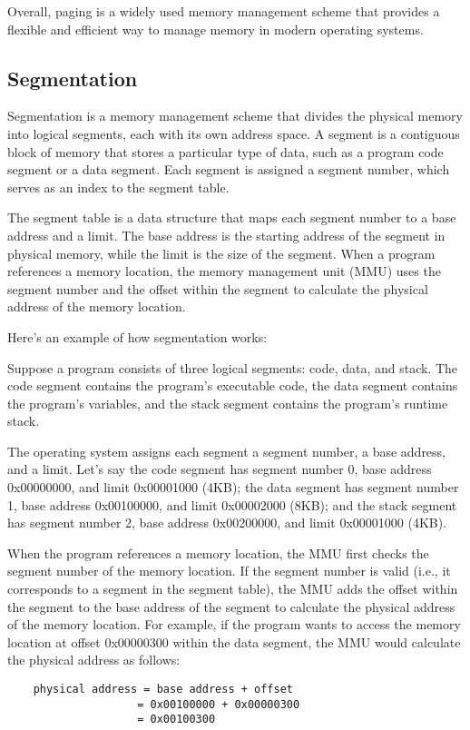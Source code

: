 \documentclass[journal,onecolumn]{IEEEtran}
\begin{document}
Overall, paging is a widely used memory management scheme that provides a flexible and efficient way to manage memory in modern operating systems.

\subsection{Segmentation}
Segmentation is a memory management scheme that divides the physical memory into logical segments, each with its own address space. A segment is a contiguous block of memory that stores a particular type of data, such as a program code segment or a data segment. Each segment is assigned a segment number, which serves as an index to the segment table.

The segment table is a data structure that maps each segment number to a base address and a limit. The base address is the starting address of the segment in physical memory, while the limit is the size of the segment. When a program references a memory location, the memory management unit (MMU) uses the segment number and the offset within the segment to calculate the physical address of the memory location.

Here's an example of how segmentation works:

Suppose a program consists of three logical segments: code, data, and stack. The code segment contains the program's executable code, the data segment contains the program's variables, and the stack segment contains the program's runtime stack.

The operating system assigns each segment a segment number, a base address, and a limit. Let's say the code segment has segment number 0, base address 0x00000000, and limit 0x00001000 (4KB); the data segment has segment number 1, base address 0x00100000, and limit 0x00002000 (8KB); and the stack segment has segment number 2, base address 0x00200000, and limit 0x00001000 (4KB).

When the program references a memory location, the MMU first checks the segment number of the memory location. If the segment number is valid (i.e., it corresponds to a segment in the segment table), the MMU adds the offset within the segment to the base address of the segment to calculate the physical address of the memory location. For example, if the program wants to access the memory location at offset 0x00000300 within the data segment, the MMU would calculate the physical address as follows:

\begin{verbatim}
    physical address = base address + offset
                    = 0x00100000 + 0x00000300
                    = 0x00100300
\end{verbatim}
\end{document}
